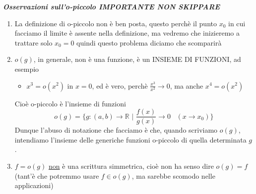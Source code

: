 \documentclass{article}
\theoremstyle{definition}
\newcommand{\R}{\mathbb{R}}
\begin{document}
\begin{center}
    \textbf{\textit{Osservazioni sull'o-piccolo IMPORTANTE NON SKIPPARE}}
\end{center}
    \begin{enumerate}
        \item La definizione di o-piccolo non è ben posta, questo perchè il punto $x_0$ in cui facciamo il limite è assente nella definizione, ma vedremo che inizieremo a trattare solo $x_0=0$ quindi questo problema diciamo che scomparirà
        \item $o(g)$, in generale, non è una funzione, è un INSIEME DI FUNZIONI, ad esempio \begin{itemize}
            \item $x^3=o(x^2)$ in $x=0$, ed è vero, perchè $\frac{x^3}{x^2} \to 0$, ma anche $x^4=o(x^2)$
        \end{itemize}
        Cioè o-piccolo è l'insieme di funzioni
        \begin{equation}
            o(g)=\{g: (a,b) \to \R \,\, | \,\, \frac{f(x)}{g(x)} \to 0 \,\,\,\,\, (x \to x_0)\}
        \end{equation}
        Dunque l'abuso di notazione che facciamo è che, quando scriviamo $o(g)$, intendiamo l'insieme delle generiche funzioni o-piccolo di quella determinata $g$.
        \item $f=o(g)$ \underline{non} è una scrittura simmetrica, cioè non ha senso dire $o(g)=f$ (tant'è che potremmo usare $f \in o(g)$, ma sarebbe scomodo nelle applicazioni)
    \end{enumerate}
\end{document}
